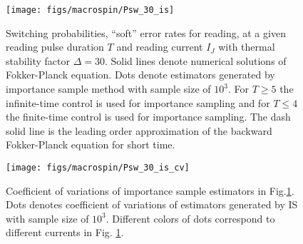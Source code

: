 \documentclass[journal,transmag]{IEEEtran}
\begin{document}
\begin{figure}[h]
   \centering
         \texttt{[image: figs/macrospin/Psw\_30\_is]}   
   \caption{Switching probabilities, ``soft'' error rates for reading,  at a given reading pulse duration $T$ and reading current $I_J$ with thermal stability factor $\Delta = 30.$ Solid lines denote numerical solutions of Fokker-Planck equation. Dots denote estimators generated by importance sample method with sample size of $10^3$. For $T \ge 5$ the infinite-time control is used for importance sampling and  for $T \le 4$ the finite-time control is used for importance sampling. The dash solid line is the leading order approximation of the backward Fokker-Planck equation for short time.}
   \label{fig:MacroIS30}
\end{figure}


\begin{figure}[h]
   \centering
         \texttt{[image: figs/macrospin/Psw\_30\_is\_cv]}
   \caption{Coefficient of variations of importance sample estimators in Fig.\ref{fig:MacroIS30}. Dots denotes coefficient of variations  of estimators generated by IS with sample size of $10^3$. Different colors of dots correspond to different currents in Fig. \ref{fig:MacroIS30}.}
   \label{fig:MacroIS30_cv}
\end{figure}
\end{document}
